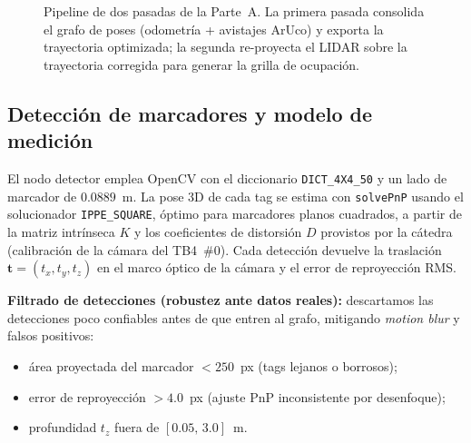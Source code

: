 \begin{figure}[t]
\centering
{}
\caption{Pipeline de dos pasadas de la Parte~A. La primera pasada consolida el grafo de poses (odometría + avistajes ArUco) y exporta la trayectoria optimizada; la segunda re-proyecta el LIDAR sobre la trayectoria corregida para generar la grilla de ocupación.}
\label{fig:pipeline_a}
\end{figure}

\subsection{Detección de marcadores y modelo de medición}
El nodo detector emplea OpenCV \cite{opencv} con el diccionario \texttt{DICT\_4X4\_50} y un lado de marcador de $0.0889$~m. La pose 3D de cada tag se estima con \texttt{solvePnP} usando el solucionador \texttt{IPPE\_SQUARE}, óptimo para marcadores planos cuadrados, a partir de la matriz intrínseca $K$ y los coeficientes de distorsión $D$ provistos por la cátedra (calibración de la cámara del TB4~$\#0$). Cada detección devuelve la traslación $\mathbf{t}=(t_x,t_y,t_z)$ en el marco óptico de la cámara y el error de reproyección RMS.

\textbf{Filtrado de detecciones (robustez ante datos reales):} descartamos las detecciones poco confiables antes de que entren al grafo, mitigando \emph{motion blur} y falsos positivos:
\begin{itemize}
\item área proyectada del marcador $< 250$~px (tags lejanos o borrosos);
\item error de reproyección $> 4.0$~px (ajuste PnP inconsistente por desenfoque);
\item profundidad $t_z$ fuera de $[0.05,\,3.0]$~m.
\end{itemize}

